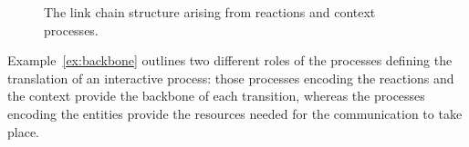 \begin{example}
\begin{figure}[t]
  \caption{The link chain structure arising from reactions and context processes.}
   \label{fig:backbone}
 \end{figure}
 \end{example}

Example~\ref{ex:backbone}   outlines two different roles of the processes defining the translation of an interactive process: those processes encoding the reactions and the context provide the backbone of each transition, whereas the processes encoding the entities provide the resources needed for the communication to take place.

